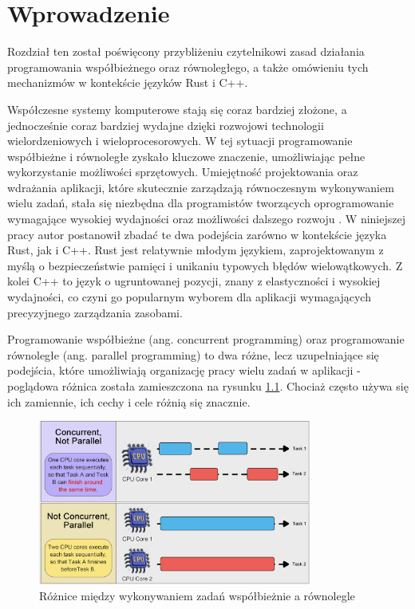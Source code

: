 \chapter{Wprowadzenie}
Rozdział ten został poświęcony przybliżeniu czytelnikowi zasad działania programowania współbieżnego oraz równoległego, a także omówieniu tych mechanizmów w kontekście języków Rust i C++.

Współczesne systemy komputerowe stają się coraz bardziej złożone, a jednocześnie coraz bardziej wydajne dzięki rozwojowi technologii wielordzeniowych i wieloprocesorowych. W tej sytuacji programowanie współbieżne i równoległe zyskało kluczowe znaczenie, umożliwiając pełne wykorzystanie możliwości sprzętowych. Umiejętność projektowania oraz wdrażania aplikacji, które skutecznie zarządzają równoczesnym wykonywaniem wielu zadań, stała się niezbędna dla programistów tworzących oprogramowanie wymagające wysokiej wydajności oraz możliwości dalszego rozwoju \cite{IntroductionToConcurrencyAndParallelism, ConcurrencyInAction, ProgramminInOpenMp, ParallelProgramminginC++withOpenMP}. W niniejszej pracy autor postanowił zbadać te dwa podejścia zarówno w kontekście języka Rust, jak i C++. Rust jest relatywnie młodym językiem, zaprojektowanym z myślą o bezpieczeństwie pamięci i unikaniu typowych błędów wielowątkowych. Z kolei C++ to język o ugruntowanej pozycji, znany z elastyczności i wysokiej wydajności, co czyni go popularnym wyborem dla aplikacji wymagających precyzyjnego zarządzania zasobami.

Programowanie współbieżne (ang. concurrent programming) oraz programowanie równoległe (ang. parallel programming) to dwa różne, lecz uzupełniające się podejścia, które umożliwiają organizację pracy wielu zadań w aplikacji - poglądowa różnica została zamieszczona na rysunku \ref{fig:concurrent_vs_parallel}. Chociaż często używa się ich zamiennie, ich cechy i cele różnią się znacznie.

\begin{figure}[H]
    \centering
    \includegraphics[width=0.8\textwidth]{images/ConcurrentParallelCompare.png}
    \caption{Różnice między wykonywaniem zadań współbieżnie a równolegle \cite{bytebytegoEP108Design}}
    \label{fig:concurrent_vs_parallel}
\end{figure}

